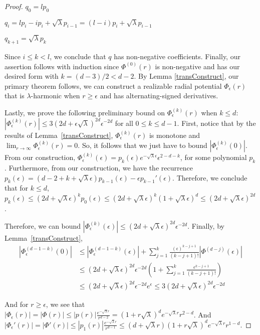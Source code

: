 \begin{proof}
$q_0 = l p_0$

$q_i = lp_i - ip_i + \sqrt{\lambda}p_{i-1} = (l-i)p_i + \sqrt{\lambda}p_{i-1}$ 

$q_{k+1} = \sqrt{\lambda} p_k$

Since $i \leq k < l$, we conclude that $q$ has non-negative coefficients. Finally, our assertion follows with induction since $\Phi^{(0)}(r)$ is non-negative and has our desired form with $k = (d-3)/2 < d-2$. By Lemma \ref{transConstruct}, our primary theorem follows, we can construct a realizable radial potential $\Phi_\epsilon(r)$ that is $\lambda$-harmonic when $r \geq \epsilon$ and has alternating-signed derivatives.

Lastly, we prove the following preliminary bound on $\Phi_\epsilon^{(k)}(r)$ when $k \leq d$: $|\Phi_\epsilon^{(k)}(r)| \leq 3(2d + \epsilon \sqrt{\lambda})^{2d}\epsilon^{-2d}  $ for all $0 \leq k \leq d-1$. First, notice that by the results of Lemma~\ref{transConstruct}, $\Phi_\epsilon^{(k)}(r)$ is monotone and $\lim_{r\to\infty}\Phi_\epsilon^{(k)}(r) = 0$. So, it follows that we just have to bound $|\Phi_{\epsilon}^{(k)}(0)|$. From our construction, $\Phi_{\epsilon}^{(k)}(\epsilon) = p_k(\epsilon)e^{-\sqrt{\lambda}\epsilon}\epsilon^{2-d-k}$, for some polynomial $p_k$. Furthermore, from our construction, we have the recurrence $p_{k}(\epsilon) = (d-2+k + \sqrt{\lambda}\epsilon)p_{k-1}(\epsilon) - \epsilon p_{k-1}'(\epsilon)$. Therefore, we conclude that for $k \leq d$, $p_k(\epsilon) \leq (2d + \sqrt{\lambda} \epsilon)^kp_0(\epsilon) \leq  (2d + \sqrt{\lambda} \epsilon)^k(1+\sqrt{\lambda}\epsilon)^d \leq (2d + \sqrt{\lambda}\epsilon)^{2d}$. 

Therefore, we can bound
 $|\Phi_\epsilon^{(k)}(\epsilon)| \leq (2d + \sqrt{\lambda}\epsilon)^{2d}\epsilon^{-2d}$. Finally, by Lemma~\ref{transConstruct}, 
\begin{align*}
|\Phi_{\epsilon}^{(d-1-k)}(0)| 
& \leq |\Phi_{\epsilon}^{(d-1-k)}(\epsilon)| + \sum_{j=1}^k \frac{(\epsilon )^{k-j+1}}{(k-j+1)!} |\Phi^{(d-j)}(\epsilon)| \\
& \leq (2d + \sqrt{\lambda}\epsilon)^{2d}\epsilon^{-2d} (1 + \sum_{j=1}^k \frac{\epsilon^{k-j+1}}{(k-j+1)!}) \\
& \leq (2d + \sqrt{\lambda}\epsilon)^{2d}\epsilon^{-2d} e^{\epsilon} \leq 3(2d + \sqrt{\lambda}\epsilon)^{2d}\epsilon^{-2d} 
\end{align*}

And for $r \geq \epsilon$, we see that $|\Phi_\epsilon(r)| = |\Phi(r)| \leq |p(r)|\frac{e^{-\sqrt{\lambda}r}}{r^{d-2}} = (1+r\sqrt{\lambda})^de^{-\sqrt{\lambda}r}r^{2-d}$. And $|\Phi_\epsilon'(r)| = |\Phi'(r)| \leq |p_1(r)| \frac{e^{-\sqrt{\lambda} r}}{r^{d-1}} \leq (d+\sqrt{\lambda}r)(1+ r\sqrt{\lambda})^de^{-\sqrt{\lambda} r} r^{1-d}$.



\end{proof}
